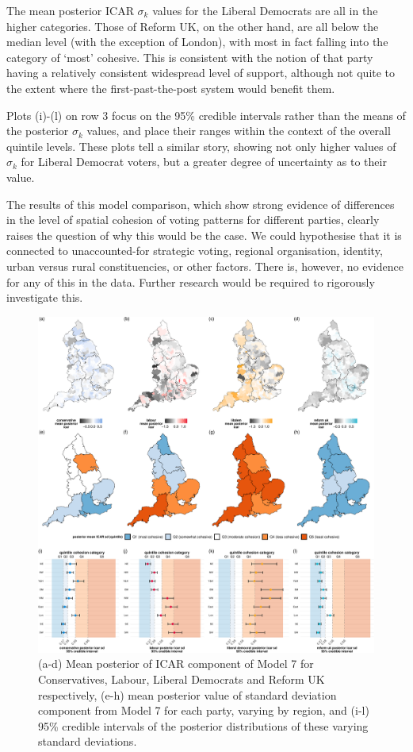 \documentclass[webpdf,large,contemporary,namedate]{oup-authoring-template}
\theoremstyle{thmstyleone}
\theoremstyle{thmstyletwo}
\theoremstyle{thmstylethree}
\begin{document}
The mean posterior ICAR \(\sigma_k\) values for the Liberal Democrats
are all in the higher categories. Those of Reform UK, on the other hand,
are all below the median level (with the exception of London), with most
in fact falling into the category of `most' cohesive. This is consistent
with the notion of that party having a relatively consistent widespread
level of support, although not quite to the extent where the
first-past-the-post system would benefit them.

Plots (i)-(l) on row 3 focus on the 95\% credible intervals rather than
the means of the posterior \(\sigma_k\) values, and place their ranges
within the context of the overall quintile levels. These plots tell a
similar story, showing not only higher values of \(\sigma_k\) for
Liberal Democrat voters, but a greater degree of uncertainty as to their
value.

The results of this model comparison, which show strong evidence of
differences in the level of spatial cohesion of voting patterns for
different parties, clearly raises the question of why this would be the
case. We could hypothesise that it is connected to unaccounted-for
strategic voting, regional organisation, identity, urban versus rural
constituencies, or other factors. There is, however, no evidence for any
of this in the data. Further research would be required to rigorously
investigate this.

\begin{figure}[th]
\includegraphics[width=1\linewidth]{jrss_resubmission_files/figure-latex/figspatialposts-1} \caption{(a-d) Mean posterior of ICAR component of Model 7 for Conservatives, Labour, Liberal Democrats and Reform UK respectively, (e-h) mean posterior value of standard deviation component from Model 7 for each party, varying by region, and (i-l) 95\% credible intervals of the posterior distributions of these varying standard deviations.}\label{fig:figspatialposts}
\end{figure}
\end{document}
